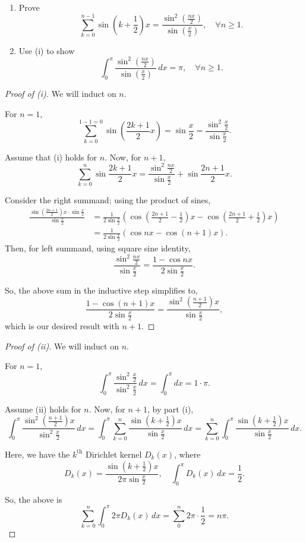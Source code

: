 \documentclass[../hw5]{subfiles}
\begin{document}
\begin{problem}
\begin{enumerate}
	\item Prove \[
		      \sum_{k=0 }^{n-1} \sin{\left( k+\frac{1}{2} \right) x } = \frac{\sin^2{\left( \frac{nx}{2} \right) } }{\sin{(\frac{x}{2})} },\quad \forall n\ge 1
		      .\]
	\item Use (i) to show \[
		      \int_{0}^{\pi} \frac{\sin^2{\left( \frac{nx}{2} \right) } }{\sin{\left( \frac{x}{2} \right) } } \,dx = \pi, \quad \forall n\ge 1
		      .\]
\end{enumerate}
\end{problem}
\begin{proof}[Proof of (i)]
	We will induct on $n$.

	For $n=1$,  \[
		\sum_{k=0}^{1-1=0} \sin{\left( \frac{2k+1}{2}x \right) } = \sin{\frac{x}{2}} = \frac{\sin^2{\frac{x}{2}} }{\sin{\frac{x}{2}} }
		.\]

	Assume that (i) holds for $n$.
	Now, for $n+1$, \[
		\sum_{k=0 }^{n} \sin{\frac{2k+1}{2}x} = \frac{\sin^2{\frac{nx}{2}}}{\sin{\frac{x}{2}} }+\sin{\frac{2n+1}{2}x}
		.\]

	Consider the right summand; using the product of sines,
	\begin{align*}
		\frac{\sin{\left(\frac{2n+1}{2}\right)x}\cdot \sin{\frac{x}{2}}  }{\sin{\frac{x}{2}} }
		 & = \frac{1}{2\sin{\frac{x}{2}} }\left( \cos{\left( \frac{2n+1}{2}-\frac{1}{2} \right)x } - \cos{ \left( \frac{2n+1}{2}+\frac{1}{2} \right) x}  \right) \\
		 & = \frac{1}{2\sin{\frac{x}{2}} }\left( \cos{nx}-\cos{(n+1)x}   \right)
		.\end{align*}
	Then, for left summand, using square sine identity, \[
		\frac{\sin^2{\frac{nx}{2}}}{\sin{\frac{x}{2}} } = \frac{1-\cos{nx} }{2\sin{\frac{x}{2}} }
		.\]

	So, the above sum in the inductive step simplifies to, \[
		\frac{1-\cos{(n+1)x} }{2\sin{\frac{x}{2}} } = \frac{\sin^2{\left(\frac{n+1}{2}\right)x} }{\sin{\frac{x}{2}} }
		,\] which is our desired result with $n+1$.
\end{proof}
\begin{proof}[Proof of (ii)]
	We will induct on $n$.

	For $n=1$,  \[
		\int_{0}^{\pi} \frac{\sin^2{\frac{x}{2}} }{\sin^2{\frac{x}{2}}} \,dx = \int_{0}^{\pi} dx = 1\cdot \pi
		.\]

	Assume (ii) holds for $n$.
	Now, for $n+1$, by part (i), \[
		\int_{0}^{\pi} \frac{\sin^2{\left( \frac{n+1}{2} \right) x} }{\sin^2{\frac{x}{2}} } \,dx
		= \int_{0}^{\pi} \sum_{k=0}^{n} \frac{\sin{\left( k+\frac{1}{2} \right) x} }{\sin{\frac{x}{2}} } \,dx
		= \sum_{k=0}^{n} \int_{0}^{\pi} \frac{\sin{\left( k+\frac{1}{2} \right) x} }{\sin{\frac{x}{2}} } \,dx
		.\]

	Here, we have the $k^{\text{th}}$ Dirichlet kernel $D_k(x)$, where \[
		D_k(x)=\frac{\sin{\left( k+\frac{1}{2} \right) x} }{2\pi\sin{\frac{x}{2}} },
		\quad \int_{0}^{\pi} D_k(x) \,dx = \frac{1}{2}
		.\]

	So, the above is \[
		\sum_{k=0 }^{n} \int_{0}^{\pi} 2\pi D_k(x) \,dx = \sum_{0}^{n} 2\pi\cdot \frac{1}{2} = n\pi
		.\]
\end{proof}
\end{document}
